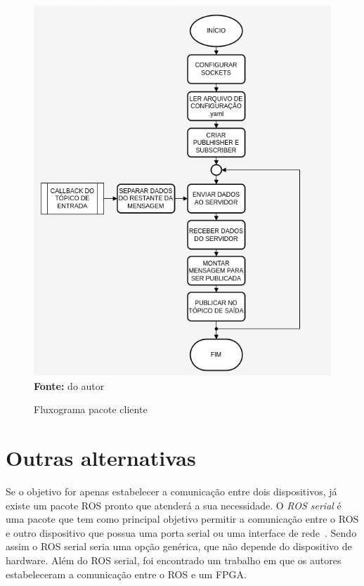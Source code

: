\begin{figure}[ht]
	\caption{Fluxograma pacote cliente}
	\begin{center}
		\includegraphics[scale=0.47]{imagens/fluxogramaCliente.png}\\
		{\small \textbf{Fonte:} do autor}
    \end{center}\label{fig:clientfluxo}
\end{figure}


\section{Outras alternativas}

Se o objetivo for apenas estabelecer a comunicação entre dois dispositivos, já existe um pacote ROS pronto que atenderá a sua necessidade. O \textit{ROS serial} é uma pacote que tem como principal objetivo permitir a comunicação entre o ROS e outro dispositivo que possua uma porta serial ou uma interface de rede~\cite{RosSeria}. Sendo assim o ROS serial seria uma opção genérica, que não depende do dispositivo de hardware. Além do ROS serial, foi encontrado um trabalho em que os autores estabeleceram a comunicação entre o ROS e um FPGA\@. 

